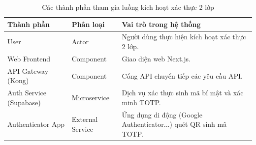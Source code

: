 \begin{table}[H]
\centering
\renewcommand{\arraystretch}{1.3}

\begin{tabular}{|l|l|p{5cm}|}
\hline
\textbf{Thành phần} & \textbf{Phân loại} & \textbf{Vai trò trong hệ thống} \\ \hline
User & Actor & Người dùng thực hiện kích hoạt xác thực 2 lớp. \\ \hline
Web Frontend & Component & Giao diện web Next.js. \\ \hline
API Gateway (Kong) & Component & Cổng API chuyển tiếp các yêu cầu API. \\ \hline
Auth Service (Supabase) & Microservice & Dịch vụ xác thực sinh mã bí mật và xác minh TOTP. \\ \hline
Authenticator App & External Service & Ứng dụng di động (Google Authenticator...) quét QR sinh mã TOTP. \\ \hline
\end{tabular}
\caption{Các thành phần tham gia luồng kích hoạt xác thực 2 lớp}
\end{table}
